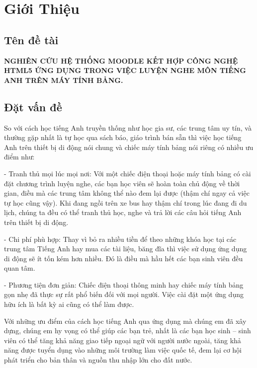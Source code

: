 
\chapter{Giới Thiệu}
\ifpdf
    \graphicspath{{Chapter1/Chapter1Figs/PNG/}{Chapter1/Chapter1Figs/PDF/}{Chapter1/Chapter1Figs/}}
\else
    \graphicspath{{Chapter1/Chapter1Figs/EPS/}{Chapter1/Chapter1Figs/}}
\fi

\section{Tên đề tài}

\textbf{	NGHIÊN CỨU HỆ THỐNG MOODLE KẾT HỢP CÔNG NGHỆ HTML5 ỨNG DỤNG TRONG VIỆC LUYỆN NGHE MÔN TIẾNG ANH TRÊN MÁY TÍNH BẢNG.}

\section{Đặt vấn đề}

So với cách học tiếng Anh truyền thống như học gia sư, các trung tâm uy tín, và thường gặp nhất là tự học qua sách báo, giáo trình bán sẵn thì việc học tiếng Anh trên thiết bị di động nói chung và chiếc máy tính bảng nói riêng có nhiều ưu điểm như:

\quad - Tranh thủ mọi lúc mọi nơi: Với một chiếc điện thoại hoặc máy tính bảng có cài đặt chương trình luyện nghe, các bạn học viên sẽ hoàn toàn chủ động về thời gian, điều mà các trung tâm không thể nào đem lại được (thậm chí ngay cả việc tự học cũng vậy). Khi đang ngồi trên xe bus hay thậm chí trong lúc đang đi du lịch, chúng ta đều có thể tranh thủ học, nghe và trả lời các câu hỏi tiếng Anh trên thiết bị di động.

\quad - Chi phí phù hợp: Thay vì bỏ ra nhiều tiền để theo những khóa học tại các trung tâm Tiếng Anh hay mua các tài liệu, băng đĩa thì việc sử dụng ứng dụng di động sẽ ít tốn kém hơn nhiều. Đó là điều mà hầu hết các bạn sinh viên đều quan tâm.

\quad - Phương tiện đơn giản: Chiếc điện thoại thông minh hay chiếc máy tính bảng gọn nhẹ đã thực sự rất phổ biến đối với mọi người. Việc cài đặt một ứng dụng hữu ích là bất kỳ ai cũng có thể làm được.

Với những ưu điểm của cách học tiếng Anh qua ứng dụng mà chúng em đã xây dựng, chúng em hy vọng có thể giúp các bạn trẻ, nhất là các bạn học sinh – sinh viên có thể tăng khả năng giao tiếp ngoại ngữ với người nước ngoài, tăng khả năng được tuyển dụng vào những môi trường làm việc quốc tế, đem lại cơ hội phát triển cho bản thân và nguồn thu nhập lớn cho đất nước.

